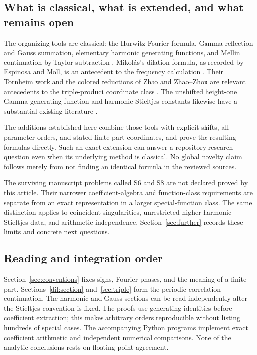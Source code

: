 \subsection{What is classical, what is extended, and what remains open}

The organizing tools are classical: the Hurwitz Fourier formula,
Gamma reflection and Gauss summation, elementary harmonic generating
functions, and Mellin continuation by Taylor subtraction
\cite{dlmf-hurwitz,gs:DLMF}.  Mikol\'as's dilation formula, as recorded
by Espinosa and Moll, is an antecedent to the frequency calculation
\cite{espinosa-hurwitz}.  Their Tornheim work and the colored reductions
of Zhao and Zhao--Zhou are relevant antecedents to the triple-product
coordinate class \cite{espinosa-tornheim,zhao-colored,zhao-zhou}.
The unshifted height-one Gamma generating function and harmonic
Stieltjes constants likewise have a substantial existing literature
\cite{harm:KanekoSakata,harm:Young2024,harm:Kargin2023}.

The additions established here combine those tools with explicit shifts,
all parameter orders, and stated finite-part coordinates, and prove the
resulting formulas directly.  Such an exact extension can answer a
repository research question even when its underlying method is
classical.  No global novelty claim follows merely from not finding
an identical formula in the reviewed sources.

The surviving manuscript problems called S6 and S8 are not declared
proved by this article.  Their narrower coefficient-algebra and
function-class requirements are separate from an exact representation
in a larger special-function class.  The same distinction applies to
coincident singularities, unrestricted higher harmonic Stieltjes data,
and arithmetic independence.  Section~\ref{sec:further} records these
limits and concrete next questions.

\subsection{Reading and integration order}

Section~\ref{sec:conventions} fixes signs, Fourier phases, and the meaning
of a finite part.  Sections~\ref{dil:section} and~\ref{sec:triple} form
the periodic-correlation continuation.  The harmonic and Gauss sections
can be read independently after the Stieltjes convention is fixed.
The proofs use generating identities before coefficient extraction;
this makes arbitrary orders reproducible without listing hundreds of
special cases.  The accompanying Python programs implement exact
coefficient arithmetic and independent numerical comparisons.  None of
the analytic conclusions rests on floating-point agreement.
